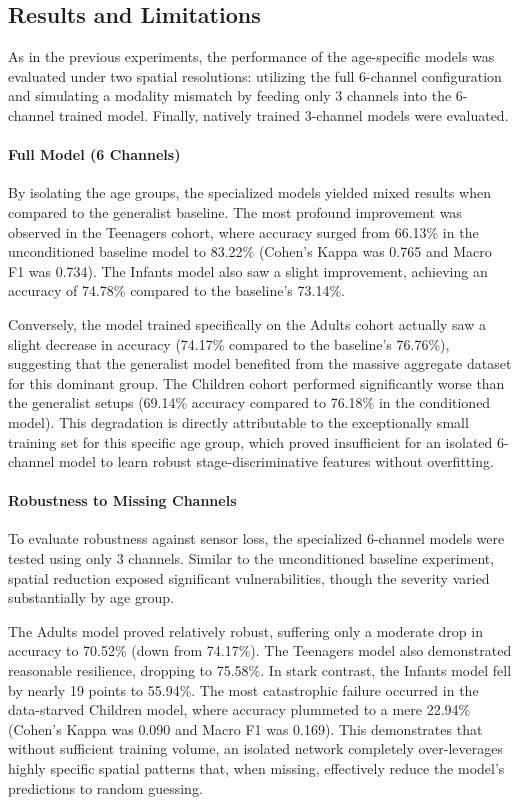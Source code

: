 \subsection{Results and Limitations}
As in the previous experiments, the performance of the age-specific models was evaluated under two spatial resolutions: utilizing the full 6-channel configuration and simulating a modality mismatch by feeding only 3 channels into the 6-channel trained model. Finally, natively trained 3-channel models were evaluated.

\paragraph{Full Model (6 Channels)}
By isolating the age groups, the specialized models yielded mixed results when compared to the generalist baseline. The most profound improvement was observed in the Teenagers cohort, where accuracy surged from 66.13\% in the unconditioned baseline model to 83.22\% (Cohen's Kappa was 0.765 and Macro F1 was 0.734). The Infants model also saw a slight improvement, achieving an accuracy of 74.78\% compared to the baseline's 73.14\%. 

Conversely, the model trained specifically on the Adults cohort actually saw a slight decrease in accuracy (74.17\% compared to the baseline's 76.76\%), suggesting that the generalist model benefited from the massive aggregate dataset for this dominant group. The Children cohort performed significantly worse than the generalist setups (69.14\% accuracy compared to 76.18\% in the conditioned model). This degradation is directly attributable to the exceptionally small training set for this specific age group, which proved insufficient for an isolated 6-channel model to learn robust stage-discriminative features without overfitting.

\paragraph{Robustness to Missing Channels}
To evaluate robustness against sensor loss, the specialized 6-channel models were tested using only 3 channels. Similar to the unconditioned baseline experiment, spatial reduction exposed significant vulnerabilities, though the severity varied substantially by age group. 

The Adults model proved relatively robust, suffering only a moderate drop in accuracy to 70.52\% (down from 74.17\%). The Teenagers model also demonstrated reasonable resilience, dropping to 75.58\%. In stark contrast, the Infants model fell by nearly 19 points to 55.94\%. The most catastrophic failure occurred in the data-starved Children model, where accuracy plummeted to a mere 22.94\% (Cohen's Kappa was 0.090 and Macro F1 was 0.169). This demonstrates that without sufficient training volume, an isolated network completely over-leverages highly specific spatial patterns that, when missing, effectively reduce the model's predictions to random guessing.

